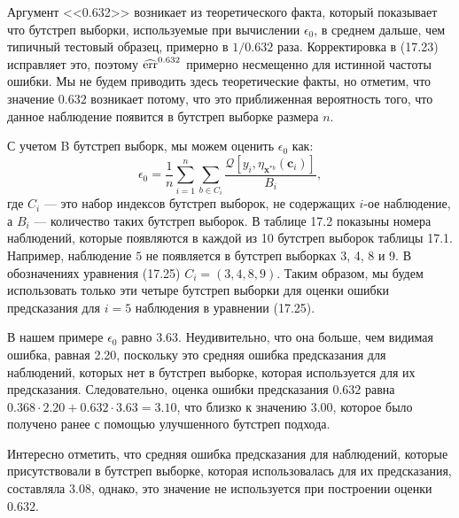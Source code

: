 Аргумент <<0.632>> возникает из теоретического факта, который показывает что бутстреп выборки, используемые при вычислении $\epsilon_{0}$, в среднем дальше, чем типичный тестовый образец, примерно в $1 / 0.632$ раза. Корректировка в (17.23) исправляет это, поэтому $\widehat{\text{err}}^{0.632}$ примерно несмещенно для истинной частоты ошибки. Мы не будем приводить здесь теоретические факты, но отметим, что значение $0.632$ возникает потому, что это приближенная вероятность того, что данное наблюдение появится в бутстреп выборке размера $n$.

С учетом B бутстреп выборк, мы можем оценить $\epsilon_{0}$ как:
\begin{equation}
\epsilon_{0} = \frac{1}{n}\sum_{i = 1}^{n} \sum_{b \in C_{i}} \frac{ \mathcal{Q}[y_{i},  \eta_{\textbf{x}^{*b}}(\textbf{c}_{i})] }{B_{i}},
\end{equation}
где $C_{i}$ --- это набор индексов бутстреп выборок, не содержащих $i$-ое наблюдение, а $B_{i}$ --- количество таких бутстреп выборок. В таблице 17.2 показыны номера наблюдений, которые появляются в каждой из 10 бутстреп выборок таблицы 17.1. Например, наблюдение $5$ не появляется в бутстреп выборках 3, 4, 8 и 9. В обозначениях уравнения (17.25) $C_{i} = (3, 4, 8, 9)$. Таким образом, мы будем использовать только эти четыре бутстреп выборки для оценки ошибки предсказания для $i = 5$ наблюдения в уравнении (17.25).

В нашем примере $\epsilon_{0}$ равно $3.63$. Неудивительно, что она больше, чем видимая ошибка, равная 2.20, поскольку это средняя ошибка предсказания для наблюдений, которых нет в бутстреп выборке, которая используется для их предсказания. Следовательно, оценка ошибки предсказания $0.632$ равна $0.368 \cdot 2.20 + 0.632 \cdot 3.63 = 3.10$, что близко к значению $3.00$, которое было получено ранее с помощью улучшенного бутстреп подхода. 

\begin{figure}[H]
\end{figure}
Интересно отметить, что средняя ошибка предсказания для наблюдений, которые присутствовали в бутстреп выборке, которая использовалась для их предсказания, составляла $3.08$, однако, это значение не используется при построении оценки $0.632$.